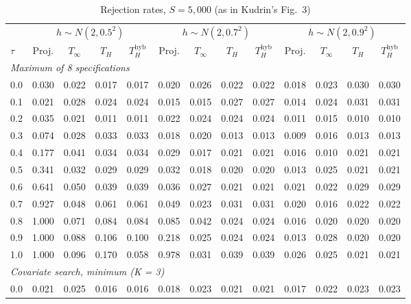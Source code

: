 \begin{table}[htbp]
\centering
\caption{Rejection rates, $S = 5{,}000$ (as in Kudrin's Fig.~3)}
\label{tab:kudrin_style_mean_dial_S5000}
\footnotesize
\setlength{\tabcolsep}{4pt}
\begin{tabular}{lcccccccccccc}
\toprule
 & \multicolumn{4}{c}{$h \sim N(2, 0.5^2)$} & \multicolumn{4}{c}{$h \sim N(2, 0.7^2)$} & \multicolumn{4}{c}{$h \sim N(2, 0.9^2)$} \\
\cmidrule(lr){2-5} \cmidrule(lr){6-9} \cmidrule(lr){10-13}
$\tau$ & Proj. & $T_\infty$ & $T_H$ & $T_H^{\mathrm{hyb}}$ & Proj. & $T_\infty$ & $T_H$ & $T_H^{\mathrm{hyb}}$ & Proj. & $T_\infty$ & $T_H$ & $T_H^{\mathrm{hyb}}$ \\
\midrule
\multicolumn{13}{l}{\textit{Maximum of 8 specifications}} \\
0.0 & 0.030 & 0.022 & 0.017 & 0.017 & 0.020 & 0.026 & 0.022 & 0.022 & 0.018 & 0.023 & 0.030 & 0.030 \\
0.1 & 0.021 & 0.028 & 0.024 & 0.024 & 0.015 & 0.015 & 0.027 & 0.027 & 0.014 & 0.024 & 0.031 & 0.031 \\
0.2 & 0.035 & 0.021 & 0.011 & 0.011 & 0.022 & 0.024 & 0.024 & 0.024 & 0.011 & 0.015 & 0.010 & 0.010 \\
0.3 & 0.074 & 0.028 & 0.033 & 0.033 & 0.018 & 0.020 & 0.013 & 0.013 & 0.009 & 0.016 & 0.013 & 0.013 \\
0.4 & 0.177 & 0.041 & 0.034 & 0.034 & 0.029 & 0.017 & 0.021 & 0.021 & 0.016 & 0.010 & 0.021 & 0.021 \\
0.5 & 0.341 & 0.032 & 0.029 & 0.029 & 0.032 & 0.018 & 0.020 & 0.020 & 0.013 & 0.025 & 0.021 & 0.021 \\
0.6 & 0.641 & 0.050 & 0.039 & 0.039 & 0.036 & 0.027 & 0.021 & 0.021 & 0.021 & 0.022 & 0.029 & 0.029 \\
0.7 & 0.927 & 0.048 & 0.061 & 0.061 & 0.049 & 0.023 & 0.031 & 0.031 & 0.020 & 0.016 & 0.022 & 0.022 \\
0.8 & 1.000 & 0.071 & 0.084 & 0.084 & 0.085 & 0.042 & 0.024 & 0.024 & 0.016 & 0.020 & 0.020 & 0.020 \\
0.9 & 1.000 & 0.088 & 0.106 & 0.100 & 0.218 & 0.025 & 0.024 & 0.024 & 0.013 & 0.028 & 0.020 & 0.020 \\
1.0 & 1.000 & 0.096 & 0.170 & 0.058 & 0.978 & 0.031 & 0.039 & 0.039 & 0.026 & 0.025 & 0.021 & 0.021 \\
\midrule
\multicolumn{13}{l}{\textit{Covariate search, minimum (K = 3)}} \\
0.0 & 0.021 & 0.025 & 0.016 & 0.016 & 0.018 & 0.023 & 0.021 & 0.021 & 0.017 & 0.022 & 0.023 & 0.023 \\

\end{tabular}
\end{table}
